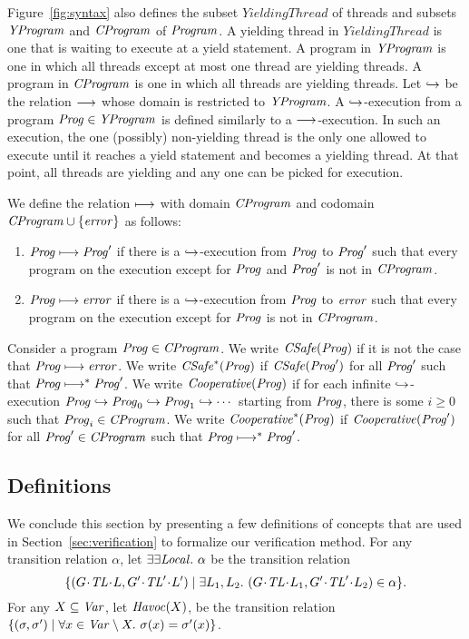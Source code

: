 Figure~\ref{fig:syntax} also defines the subset $\mathit{YieldingThread}$ of threads and subsets 
$\mathit{YProgram}$ and $\mathit{CProgram}$ of $\mathit{Program}$.
A yielding thread in $\mathit{YieldingThread}$ is one that is waiting to execute at a yield statement.
A program in $\mathit{YProgram}$ is one in which all threads except at most one thread are yielding threads.
A program in $\mathit{CProgram}$ is one in which all threads are yielding threads.
Let $\hookrightarrow$ be the relation $\longrightarrow$ whose domain is restricted to $\mathit{YProgram}$.
A $\hookrightarrow$-execution from a program $\mathit{Prog} \in \mathit{YProgram}$ is defined similarly to a $\longrightarrow$-execution.
In such an execution, the one (possibly) non-yielding thread is the only one allowed to execute until it reaches 
a yield statement and becomes a yielding thread.
At that point, all threads are yielding and any one can be picked for execution.

We define the relation $\longmapsto$ with domain $\mathit{CProgram}$ and codomain $\mathit{CProgram} \cup \{\mathit{error}\}$ as follows:
\begin{enumerate}
\item 
$\mathit{Prog} \longmapsto \mathit{Prog}'$ if there is a $\hookrightarrow$-execution from $\mathit{Prog}$ to $\mathit{Prog}'$ such that every program on the execution 
except for $\mathit{Prog}$ and $\mathit{Prog}'$ is not in $\mathit{CProgram}$.
\item
$\mathit{Prog} \longmapsto \mathit{error}$ if there is a $\hookrightarrow$-execution from $\mathit{Prog}$ to $\mathit{error}$ such that every program on the execution 
except for $\mathit{Prog}$ is not in $\mathit{CProgram}$.
\end{enumerate}

Consider a program $\mathit{Prog} \in \mathit{CProgram}$.
We write $\mathit{CSafe}(\mathit{Prog})$ if it is not the case that $\mathit{Prog} \longmapsto \mathit{error}$.
We write $\mathit{CSafe}^*(\mathit{Prog})$ if $\mathit{CSafe}(\mathit{Prog}')$ for all $\mathit{Prog}'$ such that $\mathit{Prog} \longmapsto^* \mathit{Prog}'$.
We write $\mathit{Cooperative}(\mathit{Prog})$ if for each infinite $\hookrightarrow$-execution $\mathit{Prog} \hookrightarrow \mathit{Prog}_0 \hookrightarrow \mathit{Prog}_1 \hookrightarrow \cdots$ 
starting from $\mathit{Prog}$, there is some $i \geq 0$ such that $\mathit{Prog}_i \in \mathit{CProgram}$.
We write $\mathit{Cooperative}^*(\mathit{Prog})$ if $\mathit{Cooperative}(\mathit{Prog}')$ for all $\mathit{Prog}' \in \mathit{CProgram}$ such that $\mathit{Prog} \longmapsto^* \mathit{Prog}'$.

\subsection{Definitions}
\label{sec:definitions}
We conclude this section by presenting a few definitions of concepts that are used in Section~\ref{sec:verification} to formalize
our verification method.
For any transition relation $\alpha$, let $\exists\exists {\mathit{Local}}.\ \alpha$ be the transition relation
\[\{(\MakeStore{\varsG}{\varsTL}{\varsL}, \MakeStore{\varsG'}{\varsTL'}{\varsL'}) \mid \exists \varsL_1,\varsL_2.\ (\MakeStore{\varsG}{\varsTL}{\varsL_1}, \MakeStore{\varsG'}{\varsTL'}{\varsL_2}) \in \alpha \}.\]
For any $X \subseteq \mathit{Var}$, let $\mathit{Havoc}(X)$, be the transition relation 
$\{(\sigma,\sigma') \mid \forall x \in \mathit{Var} \setminus X.\ \sigma(x) = \sigma'(x)\}$.

